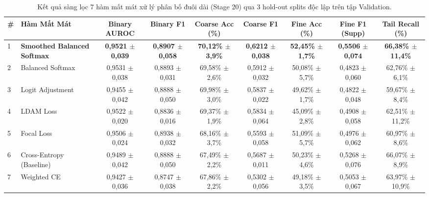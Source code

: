 \begin{table}[t]
\centering
\small
\caption{Kết quả sàng lọc 7 hàm mất mát xử lý phân bố đuôi dài (Stage 20) qua 3 hold-out splits độc lập trên tập Validation.}
\label{tab:long_tail_screening}
\begin{adjustbox}{width=\textwidth}
\begin{tabular}{llccccccc}
\toprule
\textbf{\#} & \textbf{Hàm Mất Mát} & \textbf{Binary AUROC} & \textbf{Binary F1} & \textbf{Coarse Acc (\%)} & \textbf{Coarse F1} & \textbf{Fine Acc (\%)} & \textbf{Fine F1 (Supp)} & \textbf{Tail Recall (\%)} \\
\midrule
1 & \textbf{Smoothed Balanced Softmax} & \textbf{0,9521 $\pm$ 0,039} & \textbf{0,8907 $\pm$ 0,058} & \textbf{70,12\% $\pm$ 3,9\%} & \textbf{0,6212 $\pm$ 0,038} & \textbf{52,45\% $\pm$ 1,7\%} & \textbf{0,5506 $\pm$ 0,074} & \textbf{66,38\% $\pm$ 11,4\%} \\
2 & Balanced Softmax & 0,9531 $\pm$ 0,038 & 0,8893 $\pm$ 0,031 & 69,58\% $\pm$ 2,6\% & 0,5912 $\pm$ 0,032 & 50,08\% $\pm$ 5,7\% & 0,4823 $\pm$ 0,060 & 62,76\% $\pm$ 6,1\% \\
3 & Logit Adjustment & 0,9455 $\pm$ 0,042 & 0,8888 $\pm$ 0,050 & 69,98\% $\pm$ 3,0\% & 0,5837 $\pm$ 0,022 & 49,62\% $\pm$ 1,7\% & 0,4822 $\pm$ 0,048 & 59,67\% $\pm$ 8,4\% \\
4 & LDAM Loss & 0,9522 $\pm$ 0,020 & 0,8836 $\pm$ 0,016 & 69,37\% $\pm$ 1,9\% & 0,5834 $\pm$ 0,064 & 45,09\% $\pm$ 2,8\% & 0,4908 $\pm$ 0,058 & 62,51\% $\pm$ 11,2\% \\
5 & Focal Loss & 0,9506 $\pm$ 0,024 & 0,8938 $\pm$ 0,032 & 68,16\% $\pm$ 3,7\% & 0,5593 $\pm$ 0,058 & 51,09\% $\pm$ 5,7\% & 0,4976 $\pm$ 0,062 & 60,97\% $\pm$ 8,6\% \\
6 & Cross-Entropy (Baseline) & 0,9489 $\pm$ 0,042 & 0,8888 $\pm$ 0,050 & 67,49\% $\pm$ 2,2\% & 0,5687 $\pm$ 0,011 & 50,23\% $\pm$ 4,6\% & 0,5268 $\pm$ 0,076 & 66,07\% $\pm$ 8,9\% \\
7 & Weighted CE & 0,9427 $\pm$ 0,036 & 0,8747 $\pm$ 0,038 & 67,86\% $\pm$ 2,2\% & 0,5302 $\pm$ 0,056 & 49,18\% $\pm$ 3,5\% & 0,5053 $\pm$ 0,067 & 63,97\% $\pm$ 10,9\% \\
\bottomrule
\end{tabular}
\end{adjustbox}
\end{table}

